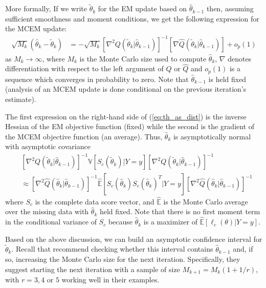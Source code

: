 \documentclass[ss]{imsart}
\theoremstyle{plain}
\theoremstyle{definition}
\theoremstyle{remark}
\newcommand{\bV}{\mathbb{V}}
\newcommand{\bE}{\mathbb{E}}
\newcommand{\hq}{\hat{Q}}
\begin{document}
More formally, If we write $\tilde{\theta}_k$ for the EM update based on $\hat{\theta}_{k-1}$ then, assuming sufficient smoothness and moment conditions, we get the following expression for the MCEM update:
%
\begin{align}
    \sqrt{M_k}(\hat{\theta}_k - \tilde{\theta}_k) &= - \sqrt{M_k} \left[ \nabla^2 Q(\tilde{\theta}_k|\hat{\theta}_{k-1})\right]^{-1} \left[\nabla \hq(\tilde{\theta}_k|\hat{\theta}_{k-1}) \right] + o_p(1) \label{eq:th_as_dist}
\end{align}
%
as $M_k \rightarrow \infty$, where $M_k$ is the Monte Carlo size used to compute $\hat{\theta}_k$, $\nabla$ denotes differentiation with respect to the left argument of $Q$ or $\hat{Q}$ and $o_p(1)$ is a sequence which converges in probability to zero. Note that $\hat{\theta}_{k-1}$ is held fixed (analysis of an MCEM update is done conditional on the previous iteration's estimate). 
%

The first expression on the right-hand side of (\ref{eq:th_as_dist}) is the inverse Hessian of the EM objective function (fixed) while the second is the gradient of the MCEM objective function (an average). Thus, $\hat{\theta}_k$ is asymptotically normal with asymptotic covariance
%
\begin{align}
    &\left[ \nabla^2 Q(\tilde{\theta}_k|\hat{\theta}_{k-1})\right]^{-1} \bV \left[ S_c (\tilde{\theta}_k) | Y=y \right] \left[ \nabla^2 Q(\tilde{\theta}_k|\hat{\theta}_{k-1})\right]^{-1}\\
    &\approx \left[ \nabla^2 \hat{Q}(\hat{\theta}_k|\hat{\theta}_{k-1})\right]^{-1} \hat{\bE} \left[ S_c(\hat{\theta}_k) S_c(\hat{\theta}_k)^T | Y=y \right] \left[ \nabla^2 \hat{Q}(\hat{\theta}_k|\hat{\theta}_{k-1})\right]^{-1} 
\end{align}
%
where $S_c$ is the complete data score vector, and $\hat{\bE}$ is the Monte Carlo average over the missing data with $\hat{\theta}_k$ held fixed. Note that there is no first moment term in the conditional variance of $S_c$ because $\hat{\theta}_k$ is a maximizer of $\hat{\bE} [\ell_c (\theta) |Y=y]$.

Based on the above discussion, we can build an asymptotic confidence interval for $\tilde{\theta}_k$. Recall that \citeauthor{Boo99} recommend checking whether this interval contains $\hat{\theta}_{k-1}$ and, if so, increasing the Monte Carlo size for the next iteration. Specifically, they suggest starting the next iteration with a sample of size $M_{k+1} = M_k ( 1 + 1/r)$, with $r = 3,4$ or $5$ working well in their examples.
\end{document}

